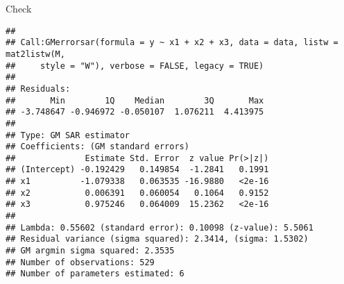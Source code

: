 Check
\begin{knitrout}
\color{fgcolor}\begin{kframe}
\begin{alltt}
    \hlkwb{<-}  \hlopt{~}  \hlopt{+}  \hlopt{+} 
                         
                         \hlstd{=}   \hlstd{=} \hlstd{),}
                         \hlstd{=} \hlstd{,}
                         \hlstd{=}  \hlstd{)}
\end{alltt}
\begin{verbatim}
## 
## Call:GMerrorsar(formula = y ~ x1 + x2 + x3, data = data, listw = mat2listw(M, 
##     style = "W"), verbose = FALSE, legacy = TRUE)
## 
## Residuals:
##       Min        1Q    Median        3Q       Max 
## -3.748647 -0.946972 -0.050107  1.076211  4.413975 
## 
## Type: GM SAR estimator
## Coefficients: (GM standard errors) 
##              Estimate Std. Error  z value Pr(>|z|)
## (Intercept) -0.192429   0.149854  -1.2841   0.1991
## x1          -1.079338   0.063535 -16.9880   <2e-16
## x2           0.006391   0.060054   0.1064   0.9152
## x3           0.975246   0.064009  15.2362   <2e-16
## 
## Lambda: 0.55602 (standard error): 0.10098 (z-value): 5.5061
## Residual variance (sigma squared): 2.3414, (sigma: 1.5302)
## GM argmin sigma squared: 2.3535
## Number of observations: 529 
## Number of parameters estimated: 6
\end{verbatim}
\end{kframe}
\end{knitrout}


